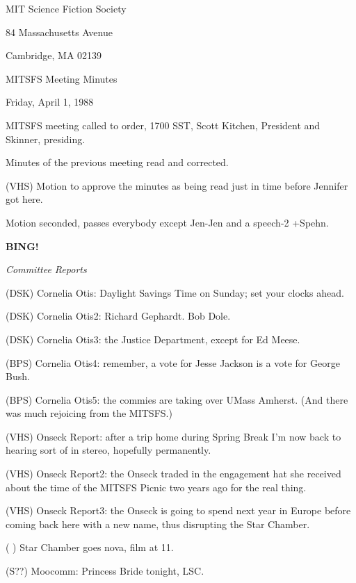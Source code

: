 \documentclass[12pt]{article}
\newcommand{\bing}{{\bf BING!} }
\newcommand{\goto}[1]{\bing \vskip 12pt \centerline{{\em{#1}}}}
\begin{document}
\begin{center}

MIT Science Fiction Society 

84 Massachusetts Avenue

Cambridge, MA 02139

\vspace{12pt}

MITSFS Meeting Minutes 

Friday, April 1, 1988

\end{center}
 
\vspace{18pt}

\setlength{\parskip}{6pt}

\noindent
MITSFS meeting called to order, 1700 SST,
Scott Kitchen, President and Skinner, presiding.

Minutes of the previous meeting read and corrected.

(VHS) Motion to approve the minutes as being read just in time before Jennifer got here.

Motion seconded, passes everybody except Jen-Jen and a speech-2 +Spehn.

\goto{Committee Reports}

(DSK) Cornelia Otis: Daylight Savings Time on Sunday; set your clocks ahead.

(DSK) Cornelia Otis2: Richard Gephardt. Bob Dole.

(DSK) Cornelia Otis3: the Justice Department, except for Ed Meese.

(BPS) Cornelia Otis4: remember, a vote for Jesse Jackson is a vote for George Bush.

(BPS) Cornelia Otis5: the commies are taking over UMass Amherst. (And there was much rejoicing from the MITSFS.)

(VHS) Onseck Report: after a trip home during Spring Break I'm now back to hearing sort of in stereo, hopefully permanently.

(VHS) Onseck Report2: the Onseck traded in the engagement hat she received about the time of the MITSFS Picnic two years ago for the real thing.

(VHS) Onseck Report3: the Onseck is going to spend next year in Europe before coming back here with a new name, thus disrupting the Star Chamber.

( ) Star Chamber goes nova, film at 11.

(S??) Moocomm: Princess Bride tonight, LSC.
\end{document}
